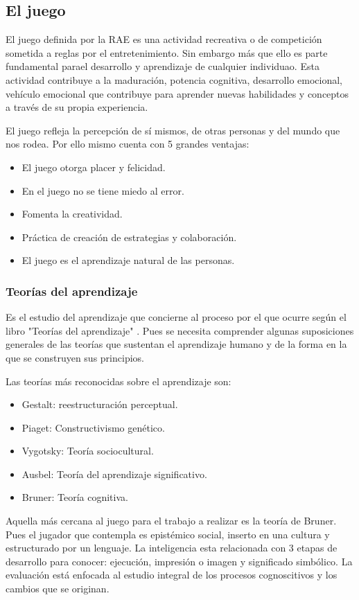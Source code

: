 \subsection{El juego}\label{juego}
El juego definida por la RAE es una actividad  recreativa o de competición sometida a reglas por el entretenimiento. Sin embargo más que ello es parte fundamental parael desarrollo y aprendizaje de cualquier individuao. Esta actividad contribuye a la maduración, potencia cognitiva, desarrollo emocional, vehículo emocional que contribuye para aprender nuevas habilidades y conceptos a través de su propia experiencia.

El juego refleja la percepción de sí mismos, de otras personas y del mundo que nos rodea. Por ello mismo cuenta con 5 grandes ventajas:
\begin{itemize}
	\item El juego otorga placer y felicidad.
	\item En el juego no se tiene miedo al error.
	\item Fomenta la creatividad.
	\item Práctica de creación de estrategias y colaboración.
	\item El juego es el aprendizaje natural de las personas.
\end{itemize}
	
\subsubsection{Teorías del aprendizaje}
Es el estudio del aprendizaje que concierne al proceso por el que ocurre según el libro "Teorías del aprendizaje" \cite{libroTeoApr}. Pues se necesita comprender algunas suposiciones generales de las teorías que sustentan el aprendizaje humano y de la forma en la que se construyen sus principios.

Las teorías más reconocidas sobre el aprendizaje son:
\begin{itemize}
	\item Gestalt: reestructuración perceptual.
	\item Piaget: Constructivismo genético.
	\item Vygotsky: Teoría sociocultural.
	\item Ausbel: Teoría del aprendizaje significativo.
	\item Bruner: Teoría cognitiva.
\end{itemize}

Aquella más cercana al juego para el trabajo a realizar es la teoría de Bruner. Pues el jugador que contempla es epistémico social, inserto en una cultura y estructurado por un lenguaje. La inteligencia esta relacionada con 3 etapas de desarrollo para conocer: ejecución, impresión o imagen y significado simbólico. La evaluación está enfocada al estudio integral de los procesos cognoscitivos y los cambios que se originan.

